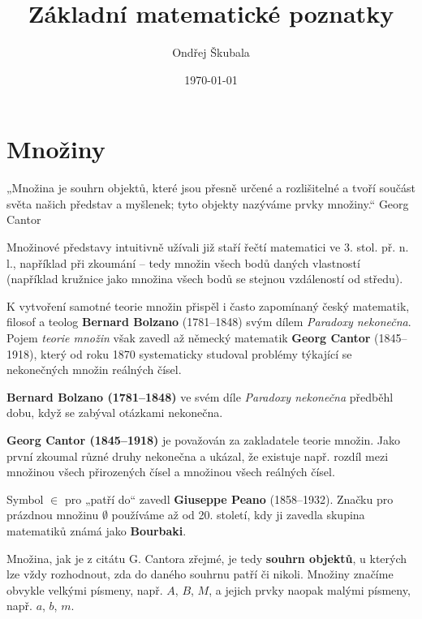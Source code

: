\documentclass[12pt,a4paper]{article}
\title{Základní matematické poznatky}
\author{Ondřej Škubala}
\date{\today}
\begin{document}
\maketitle
\newpage

\section{Množiny}
\begin{quotebox}
{„Množina je souhrn objektů, které jsou přesně určené a rozlišitelné
 a tvoří součást světa našich představ a myšlenek; tyto objekty nazýváme prvky množiny.“}
{Georg Cantor}
\end{quotebox}

\begin{historicalbox}
Množinové představy intuitivně užívali již staří řečtí matematici
ve 3. stol. př. n. l., například při zkoumání
 – tedy množin všech 
bodů daných vlastností (například kružnice jako množina 
všech bodů se stejnou vzdáleností od středu).  

\smallskip
K vytvoření samotné teorie množin přispěl i často zapomínaný český matematik, 
filosof a teolog \textbf{Bernard Bolzano} (1781–1848) 
svým dílem \emph{Paradoxy nekonečna}. Pojem \emph{teorie množin} 
však zavedl až německý matematik \textbf{Georg Cantor} (1845–1918), 
který od roku 1870 systematicky studoval problémy 
týkající se nekonečných množin reálných čísel.  

\smallskip
\textbf{Bernard Bolzano (1781–1848)} ve svém díle \emph{Paradoxy nekonečna} 
předběhl dobu, když se zabýval otázkami nekonečna.  

\smallskip
\textbf{Georg Cantor (1845–1918)} je považován za zakladatele teorie množin. 
Jako první zkoumal různé druhy nekonečna a ukázal, že existuje např. 
rozdíl mezi množinou všech přirozených čísel a množinou všech reálných čísel.

\smallskip
Symbol $\in$ pro „patří do“ zavedl \textbf{Giuseppe Peano} (1858–1932). 
Značku pro prázdnou množinu $\emptyset$ používáme až od 20. století, 
kdy ji zavedla skupina matematiků známá jako \textbf{Bourbaki}.
\end{historicalbox}

Množina, jak je z citátu G. Cantora zřejmé, je tedy \textbf{souhrn objektů}, 
u kterých lze vždy rozhodnout, zda do daného souhrnu patří či nikoli. 
Množiny značíme obvykle velkými písmeny, např. $A$, $B$, $M$, 
a jejich prvky naopak malými písmeny, např. $a$, $b$, $m$.
\end{document}
